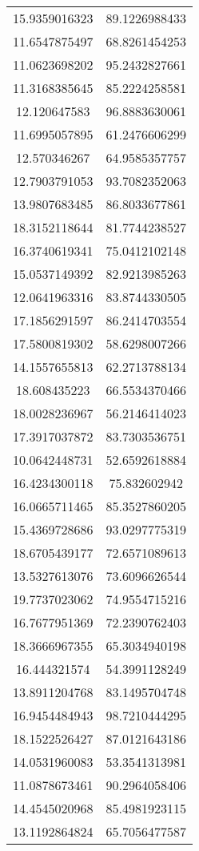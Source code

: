 \begin{table}
\begin{tabular}{cc}
15.9359016323 & 89.1226988433 \\
11.6547875497 & 68.8261454253 \\
11.0623698202 & 95.2432827661 \\
11.3168385645 & 85.2224258581 \\
12.120647583 & 96.8883630061 \\
11.6995057895 & 61.2476606299 \\
12.570346267 & 64.9585357757 \\
12.7903791053 & 93.7082352063 \\
13.9807683485 & 86.8033677861 \\
18.3152118644 & 81.7744238527 \\
16.3740619341 & 75.0412102148 \\
15.0537149392 & 82.9213985263 \\
12.0641963316 & 83.8744330505 \\
17.1856291597 & 86.2414703554 \\
17.5800819302 & 58.6298007266 \\
14.1557655813 & 62.2713788134 \\
18.608435223 & 66.5534370466 \\
18.0028236967 & 56.2146414023 \\
17.3917037872 & 83.7303536751 \\
10.0642448731 & 52.6592618884 \\
16.4234300118 & 75.832602942 \\
16.0665711465 & 85.3527860205 \\
15.4369728686 & 93.0297775319 \\
18.6705439177 & 72.6571089613 \\
13.5327613076 & 73.6096626544 \\
19.7737023062 & 74.9554715216 \\
16.7677951369 & 72.2390762403 \\
18.3666967355 & 65.3034940198 \\
16.444321574 & 54.3991128249 \\
13.8911204768 & 83.1495704748 \\
16.9454484943 & 98.7210444295 \\
18.1522526427 & 87.0121643186 \\
14.0531960083 & 53.3541313981 \\
11.0878673461 & 90.2964058406 \\
14.4545020968 & 85.4981923115 \\
13.1192864824 & 65.7056477587 \\

\end{tabular}
\end{table}
